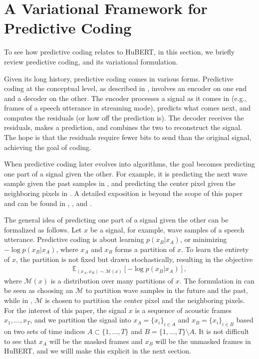 %
%
%
%
%
%
%
%
%
%
%
%
%
%
%
%
%

\section{A Variational Framework for Predictive Coding}
\label{sec:predcoding}

To see how predictive coding relates to HuBERT,
in this section, we briefly review predictive coding,
and its variational formulation.

Given its long history, predictive coding comes in various forms.
Predictive coding at the conceptual level, as described in \citet{elias1955predictive}, involves an encoder on one end and a decoder on the other.
The encoder processes a signal as it comes in (e.g., frames of a speech utterance in streaming mode), predicts what comes next, and computes the residuals (or how off the prediction is).
The decoder receives the residuals, makes a prediction, and combines the two to reconstruct the signal.
The hope is that the residuals require fewer bits to send than the original signal, achieving the goal of coding.

When predictive coding later evolves into algorithms, the goal becomes predicting one part of a signal given the other.
For example, it is predicting the next wave sample given the past samples in \citet{atal1971speech}, and predicting the center pixel given the neighboring pixels in \citet{srinivasan1982predictive}.
A detailed exposition is beyond the scope of this paper and can be found in \citet{makhoul1975linear}, \citet{huang2011predictive}, and \citet{spratling2017review}.

The general idea of predicting one part of a signal given the other can
be formalized as follows.  Let $x$ be a signal, for example, wave samples
of a speech utterance.  Predictive coding is about learning $p(x_B |
x_A)$, or minimizing $-\log p(x_B | x_A)$, where $x_A$ and $x_B$ forms
a partition of $x$.  To learn the entirety of $x$, the partition is not
fixed but drawn stochastically, resulting in the objective
\begin{align}
\mathbb{E}_{(x_A, x_B) \sim \mathcal{M}(x)}[-\log p(x_B | x_A)],
\label{eq:pc}
\end{align}
where $\mathcal{M}(x)$ is a distribution over many partitions of $x$.
The formulation in \citet{atal1971speech} can be seen as choosing an
$\mathcal{M}$ to partition wave samples in the future and the past,
while in \citet{srinivasan1982predictive}, $\mathcal{M}$ is chosen
to partition the center pixel and the neighboring pixels.  For the
interest of this paper, the signal $x$ is a sequence of acoustic frames $x_1,
\dots, x_T$, and we partition the signal into
$x_A=\{x_i\}_{i \in A}$ and $x_B = \{x_i\}_{i \in B}$
based on two sets of time indices $A \subset \{1,\dots,T\}$
and $B = \{1,\dots,T\} \setminus A$.
It is not difficult to see that $x_A$ will be the masked frames
and $x_B$ will be the unmasked frames in HuBERT,
and we willl make this explicit in the next section.
%
%
%

